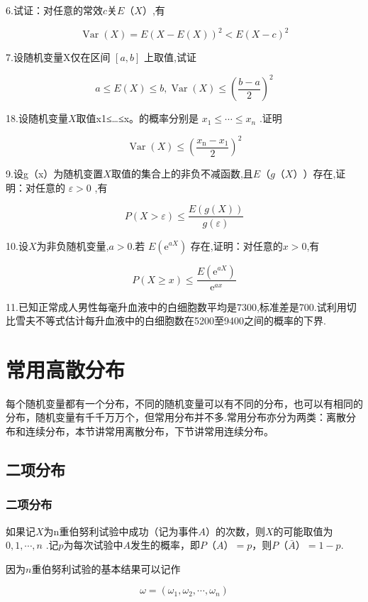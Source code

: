 6.试证：对任意的常效$ c $关$ E（X） $,有

\[
\operatorname{Var}(X)=E(X-E(X))^{2}<E(X-c)^{2}
\]

7.设随机变量X仅在区间 $[a, b]$ 上取值,试证

\[
a \leqslant E(X) \leqslant b, \operatorname{Var}(X) \leqslant\left(\frac{b-a}{2}\right)^{2}
\]

18.设随机变量$ X $取值x1≤…≤x。的概率分别是 $x_{1} \leqslant \cdots \leqslant x_{n}$ .证明

\[
\operatorname{Var}(X) \leqslant\left(\frac{x_{\mathrm{n}}-x_{1}}{2}\right)^{2}
\]

9.设g（x）为随机变置$ X $取值的集合上的非负不减函数,且$ E（g（X）） $存在,证明：对任意的 $\varepsilon>0$ ,有

\[
P(X>\varepsilon) \leqslant \frac{E(g(X))}{g(\varepsilon)}
\]

10.设$ X $为非负随机变量,$ a>0 $.若 $E\left(\mathrm{e}^{a X}\right)$ 存在,证明：对任意的$ x>0 $,有

\[
P(X \geqslant x) \leqslant \frac{E\left(\mathrm{e}^{a X}\right)}{\mathrm{e}^{a x}}
\]

11.已知正常成人男性每毫升血液中的白细胞数平均是7300,标准差是700.试利用切比雪夫不等式估计每升血液中的白细胞数在5200至9400之间的概率的下界.

\section{常用高散分布}

每个随机变量都有一个分布，不同的随机变量可以有不同的分布，也可以有相同的分布，随机变量有千千万万个，但常用分布并不多.常用分布亦分为两类：离散分布和连续分布，本节讲常用离散分布，下节讲常用连续分布。

\subsection{二项分布}

\subsubsection{二项分布}

如果记$ X $为n重伯努利试验中成功（记为事件$ A $）的次数，则$ X $的可能取值为 $0,1, \cdots, n$ .记$ p $为每次试验中$ A $发生的概率，即$ P（A）=p $，则$ P（\bar{A}）=1-p $.

因为$ n $重伯努利试验的基本结果可以记作


\[
\omega=\left(\omega_{1}, \omega_{2}, \cdots, \omega_{n}\right)
\]

